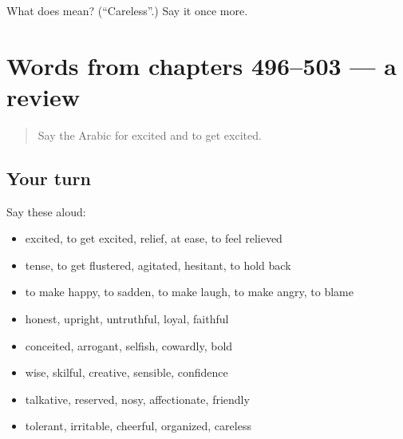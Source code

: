 \begin{tcolorbox}[breakable,colback=teal!4,colframe=teal!35!black,title={Before you move on}]
What does  mean? (\textquotedblleft{}Careless\textquotedblright{}.) Say it once more.
\end{tcolorbox}
\section[(dialogue)]{Words from chapters 496–503 — a review}

\label{lesson:AR-R503-review-496-503}



\begin{quote}
Say the Arabic for excited and to get excited.
\end{quote}

\subsection*{Your turn}
Say these aloud:

\begin{itemize}
\raggedright
  \item excited, to get excited, relief, at ease, to feel relieved
  \item tense, to get flustered, agitated, hesitant, to hold back
  \item to make happy, to sadden, to make laugh, to make angry, to blame
  \item honest, upright, untruthful, loyal, faithful
  \item conceited, arrogant, selfish, cowardly, bold
  \item wise, skilful, creative, sensible, confidence
  \item talkative, reserved, nosy, affectionate, friendly
  \item tolerant, irritable, cheerful, organized, careless
\end{itemize}

